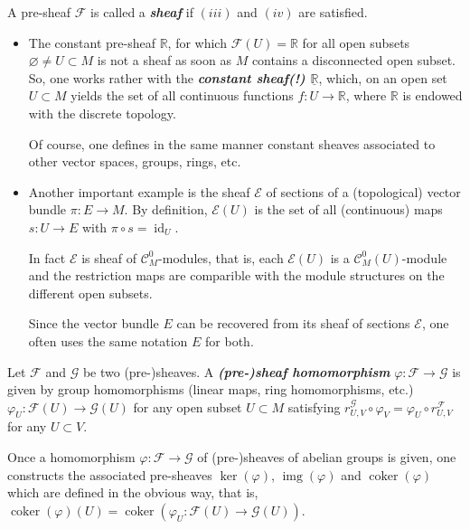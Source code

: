 \documentclass{article}
\newcommand{\R}{\mathbb{R}}
\newcommand{\Cc}{\mathcal{C}}
\newcommand{\Ec}{\mathcal{E}}
\newcommand{\Fc}{\mathcal{F}}
\newcommand{\Gc}{\mathcal{G}}
\DeclareMathOperator{\img}{img}
\DeclareMathOperator{\id}{id}
\DeclareMathOperator{\coker}{coker}
\begin{document}
\begin{defn}
	A pre-sheaf $\Fc$ is called a \textbf{\textit{sheaf}} if $(iii)$ and $(iv)$ are satisfied.
\end{defn}
\begin{example}\leavevmode
	\begin{itemize}
		\item The constant pre-sheaf $\R$, for which $\Fc(U)=\R$ for all open subsets $\varnothing\neq U\subset M$ is not a sheaf as soon as $M$ contains a disconnected open subset. So, one works rather with the \textbf{\textit{constant sheaf(!) $\underline{\R}$}}, which, on an open set $U\subset M$ yields the set of all continuous functions $f:U\to\R$, where $\R$ is endowed with the discrete topology.
	
		Of course, one defines in the same manner constant sheaves associated to other vector spaces, groups, rings, etc.
		\item Another important example is the sheaf $\Ec$ of sections of a (topological) vector bundle $\pi:E\to M$. By definition, $\Ec(U)$ is the set of all (continuous) maps $s:U\to E$ with $\pi\circ s=\id_U$.
		
		In fact $\Ec$ is sheaf of $\Cc_M^0$-modules, that is, each $\Ec(U)$ is a $\Cc_M^0(U)$-module and the restriction maps are comparible with the module structures on the different open subsets.
		
		Since the vector bundle $E$ can be recovered from its sheaf of sections $\Ec$, one often uses the same notation $E$ for both.
	\end{itemize}
\end{example}

\begin{defn}
	Let $\Fc$ and $\Gc$ be two (pre-)sheaves. A \textbf{\textit{(pre-)sheaf homomorphism}} $\varphi:\Fc\to\Gc$ is given by group homomorphisms (linear maps, ring homomorphisms, etc.) $\varphi_U:\Fc(U)\to\Gc(U)$ for any open subset $U\subset M$ satisfying $r_{U,V}^{\Gc}\circ \varphi_V=\varphi_U\circ r_{U,V}^{\Fc}$ for any $U\subset V$.
\end{defn}
Once a homomorphism $\varphi:\Fc\to \Gc$ of (pre-)sheaves of abelian groups is given, one constructs the associated pre-sheaves $\ker(\varphi)$, $\img(\varphi)$ and $\coker(\varphi)$ which are defined in the obvious way, that is, $\coker(\varphi)(U)=\coker(\varphi_U:\Fc(U)\to\Gc(U))$.
\end{document}
